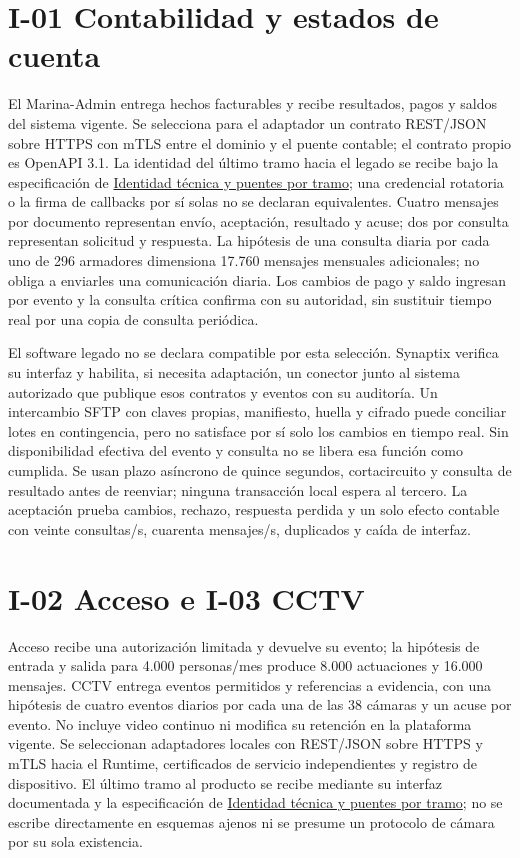 \section*{I-01 Contabilidad y estados de cuenta}
El Marina-Admin entrega hechos facturables y recibe resultados, pagos y saldos del sistema vigente. Se selecciona para el adaptador un contrato REST/JSON sobre HTTPS con mTLS entre el dominio y el puente contable; el contrato propio es OpenAPI 3.1. La identidad del último tramo hacia el legado se recibe bajo la especificación de \hyperref[sec:a42-identidad]{Identidad técnica y puentes por tramo}; una credencial rotatoria o la firma de callbacks por sí solas no se declaran equivalentes. Cuatro mensajes por documento representan envío, aceptación, resultado y acuse; dos por consulta representan solicitud y respuesta. La hipótesis de una consulta diaria por cada uno de 296 armadores dimensiona 17.760 mensajes mensuales adicionales; no obliga a enviarles una comunicación diaria. Los cambios de pago y saldo ingresan por evento y la consulta crítica confirma con su autoridad, sin sustituir tiempo real por una copia de consulta periódica.

El software legado no se declara compatible por esta selección. Synaptix verifica su interfaz y habilita, si necesita adaptación, un conector junto al sistema autorizado que publique esos contratos y eventos con su auditoría. Un intercambio SFTP con claves propias, manifiesto, huella y cifrado puede conciliar lotes en contingencia, pero no satisface por sí solo los cambios en tiempo real. Sin disponibilidad efectiva del evento y consulta no se libera esa función como cumplida. Se usan plazo asíncrono de quince segundos, cortacircuito y consulta de resultado antes de reenviar; ninguna transacción local espera al tercero. La aceptación prueba cambios, rechazo, respuesta perdida y un solo efecto contable con veinte consultas/s, cuarenta mensajes/s, duplicados y caída de interfaz.

\section*{I-02 Acceso e I-03 CCTV}
Acceso recibe una autorización limitada y devuelve su evento; la hipótesis de entrada y salida para 4.000 personas/mes produce 8.000 actuaciones y 16.000 mensajes. CCTV entrega eventos permitidos y referencias a evidencia, con una hipótesis de cuatro eventos diarios por cada una de las 38 cámaras y un acuse por evento. No incluye video continuo ni modifica su retención en la plataforma vigente. Se seleccionan adaptadores locales con REST/JSON sobre HTTPS y mTLS hacia el Runtime, certificados de servicio independientes y registro de dispositivo. El último tramo al producto se recibe mediante su interfaz documentada y la especificación de \hyperref[sec:a42-identidad]{Identidad técnica y puentes por tramo}; no se escribe directamente en esquemas ajenos ni se presume un protocolo de cámara por su sola existencia.

